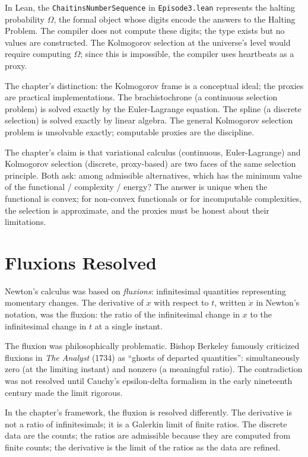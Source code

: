 In Lean, the \texttt{ChaitinsNumberSequence} in
\texttt{Episode3.lean} represents the halting probability $\Omega$,
the formal object whose digits encode the answers to the Halting
Problem. The compiler does not compute these digits; the type
exists but no values are constructed. The Kolmogorov selection at
the universe's level would require computing $\Omega$; since this
is impossible, the compiler uses heartbeats as a proxy.

The chapter's distinction: the Kolmogorov frame is a conceptual
ideal; the proxies are practical implementations. The
brachistochrone (a continuous selection problem) is solved exactly
by the Euler-Lagrange equation. The spline (a discrete selection)
is solved exactly by linear algebra. The general Kolmogorov
selection problem is unsolvable exactly; computable proxies are
the discipline.

The chapter's claim is that variational calculus (continuous,
Euler-Lagrange) and Kolmogorov selection (discrete, proxy-based)
are two faces of the same selection principle. Both ask: among
admissible alternatives, which has the minimum value of the
functional / complexity / energy? The answer is unique when the
functional is convex; for non-convex functionals or for
incomputable complexities, the selection is approximate, and the
proxies must be honest about their limitations.

\section{Fluxions Resolved}
\label{se:fluxions-resolved}

Newton's calculus was based on \emph{fluxions}: infinitesimal
quantities representing momentary changes. The derivative of $x$
with respect to $t$, written $\dot{x}$ in Newton's notation, was the
fluxion: the ratio of the infinitesimal change in $x$ to the
infinitesimal change in $t$ at a single instant.

The fluxion was philosophically problematic. Bishop Berkeley
famously criticized fluxions in \emph{The Analyst} (1734) as
``ghosts of departed quantities'': simultaneously zero (at the
limiting instant) and nonzero (a meaningful ratio). The
contradiction was not resolved until Cauchy's epsilon-delta
formalism in the early nineteenth century made the limit rigorous.

In the chapter's framework, the fluxion is resolved differently. The
derivative is not a ratio of infinitesimals; it is a Galerkin
limit of finite ratios. The discrete data are the counts; the
ratios are admissible because they are computed from finite
counts; the derivative is the limit of the ratios as the data are
refined.


